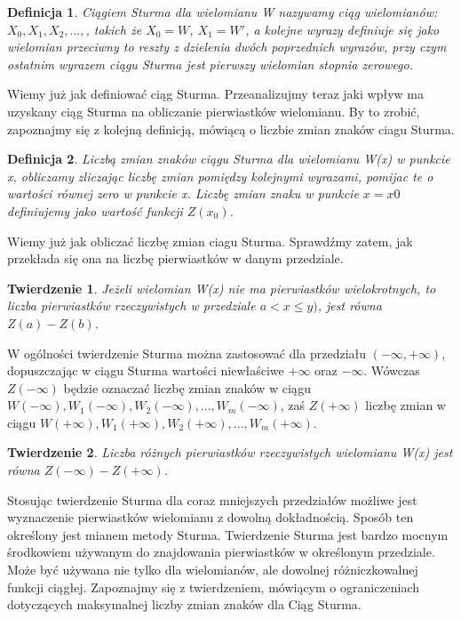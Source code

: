 \documentclass[twoside,a4paper]{book}
\newtheorem{theorem}{Twierdzenie}
\newtheorem{definition}{Definicja}
\begin{document}
\begin{definition}
	Ciągiem Sturma dla wielomianu W nazywamy ciąg wielomianów: $X_0, X_1, X_2,...,$, takich że $X_0=W$, $X_1=W'$, a kolejne wyrazy definiuje się jako wielomian przeciwny to reszty z dzielenia dwóch poprzednich wyrazów, przy czym ostatnim wyrazem ciągu Sturma jest pierwszy wielomian stopnia zerowego. 
\end{definition}

Wiemy już jak definiować ciąg Sturma. Przeanalizujmy teraz jaki wpływ ma uzyskany ciąg Sturma na obliczanie pierwiastków wielomianu. By to zrobić, zapoznajmy się z kolejną definicją, mówiącą o liczbie zmian znaków ciagu Sturma.

\begin{definition}
	Liczbą zmian znaków ciągu Sturma dla wielomianu W(x) w punkcie x, obliczamy zliczając liczbę zmian pomiędzy kolejnymi wyrazami, pomijac te o wartości równej zero w punkcie x. Liczbę zmian znaku w punkcie $x=x0$ definiujemy jako wartość funkcji $Z(x_0)$.
\end{definition}

Wiemy już jak obliczać liczbę zmian ciagu Sturma. Sprawdźmy zatem, jak przekłada się ona na liczbę pierwiastków w danym przedziale.

\begin{theorem}
	Jeżeli wielomian W(x) nie ma pierwiastków wielokrotnych, to liczba pierwiastków rzeczywistych w przedziale $a<x\le y)$, jest równa $Z(a) - Z(b)$.
\end{theorem}

W ogólności twierdzenie Sturma można zastosować dla przedziału $(-\infty,+\infty)$, dopuszczając w ciągu Sturma wartości niewłaściwe $+\infty$ oraz $-\infty$. Wówczas $Z(-\infty)$ będzie oznaczać liczbę zmian znaków w ciągu $W(-\infty), W_1(-\infty), W_2(-\infty),..., W_m(-\infty)$, zaś $Z(+\infty)$ liczbę zmian w ciągu $W(+\infty), W_1(+\infty), W_2(+\infty),..., W_m(+\infty)$.

\begin{theorem}
	Liczba różnych pierwiastków rzeczywistych wielomianu W(x) jest równa $Z(-\infty)-Z(+\infty)$.
\end{theorem}

Stosując twierdzenie Sturma dla coraz mniejszych przedziałów możliwe jest wyznaczenie pierwiastków wielomianu z dowolną dokładnością. Sposób ten określony jest mianem metody Sturma.
Twierdzenie Sturma jest bardzo mocnym środkowiem używanym do znajdowania pierwiastków w określonym przedziale. Może być używana nie tylko dla wielomianów, ale dowolnej różniczkowalnej funkcji ciągłej. Zapoznajmy się z twierdzeniem, mówiącym o ograniczeniach dotyczących maksymalnej liczby zmian znaków dla Ciąg Sturma.
\end{document}
